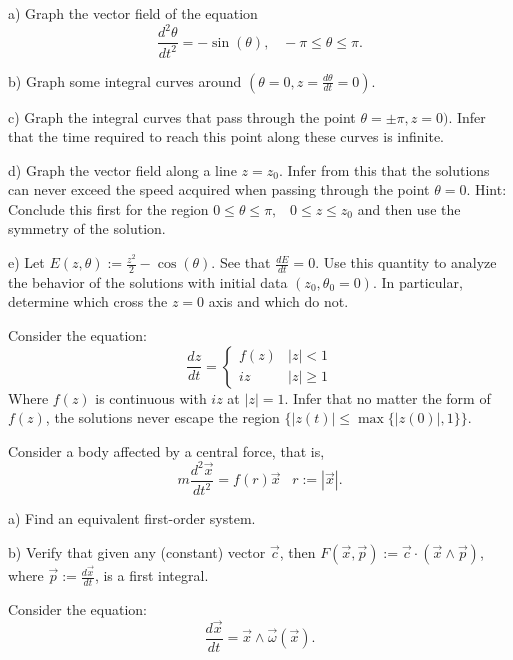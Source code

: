 a) Graph the vector field of the equation
\begin{equation}
  \label{eq:pendulo_fisico}
  \frac{d^2\theta}{dt^2} = -\sin(\theta), \;\;\;-\pi \leq \theta \leq \pi. 
\end{equation}

b) Graph some integral curves around 
$(\theta=0, z=\frac{d\theta}{dt} = 0)$.

c) Graph the integral curves that pass through the point
$\theta = \pm \pi, z=0)$. Infer that the time required 
to reach this point along these curves is infinite.

d) Graph the vector field along a line $z=z_0$.
Infer from this that the solutions can never exceed the speed acquired when passing through the point $\theta=0$. Hint: Conclude this first for the
region $0 \leq \theta \leq \pi,\;\;\; 0 \leq z \leq z_0$ and then use the symmetry of the solution.

e) Let $E(z,\theta) := \frac{z^2}{2} - \cos(\theta)$. See that 
$\frac{dE}{dt} = 0$. Use this quantity to analyze the behavior
of the solutions with initial data $(z_0,\theta_0=0)$. In particular,
determine which cross the $z=0$ axis and which do not.
\epro

\bpro 
Consider the equation:
\begin{equation}
  \frac{dz}{dt} = \left\{
  \begin{array}{ll}
    f(z) & |z| < 1 \\
    iz   & |z| \geq 1
  \end{array}
  \right.
\end{equation}
Where $f(z)$ is continuous with $iz$ at $|z|=1$.
Infer that no matter the form of $f(z)$, the solutions
never escape the region $\{|z(t)| \leq \max\{|z(0)|, 1\}\}$.
\epro

\bpro 
Consider a body affected by a central force, that is,
\begin{equation}
  m\frac{d^2\vec{x}}{dt^2} = f(r)\vec{x}\;\;\; r:= |\vec{x}|.
\end{equation}
%

a) Find an equivalent first-order system.

b) Verify that given any (constant) vector $\vec{c}$, then
   $F(\vec{x},\vec{p}) := \vec{c}\cdot(\vec{x}\wedge \vec{p})$,
   where $\vec{p} := \frac{d\vec{x}}{dt}$, is a first integral.
\epro

\bpro 
Consider the equation:
\begin{equation}
  \frac{d\vec{x}}{dt} = \vec{x} \wedge \vec{\omega}(\vec{x}).
\end{equation}
%

